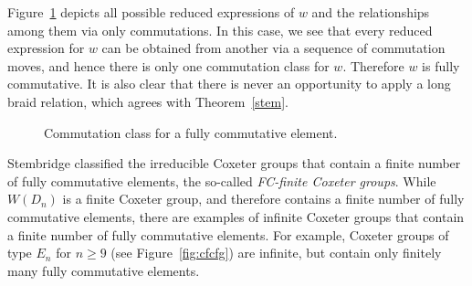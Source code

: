 \begin{example}
Figure~\ref{fig:commclass} depicts all possible reduced expressions of $w$ and the relationships among them via only commutations. In this case, we see that every reduced expression for $w$ can be obtained from another via a sequence of commutation moves, and hence there is only one commutation class for $w$. Therefore $w$ is fully commutative. It is also clear that there is never an opportunity to apply a long braid relation, which agrees with Theorem~\ref{stem}.

\begin{figure}[h]
\centering
{}
\caption{Commutation class for a fully commutative element.}
\label{fig:commclass}
\end{figure}
\end{example}

Stembridge classified the irreducible Coxeter groups that contain a finite number of fully commutative elements, the so-called \emph{FC-finite Coxeter groups}.  While $W(D_{n})$ is a finite Coxeter group, and therefore contains a finite number of fully commutative elements, there are examples of infinite Coxeter groups that contain a finite number of fully commutative elements.  For example, Coxeter groups of type $E_n$ for $n\geq 9$ (see Figure~\ref{fig:cfcfg}) are infinite, but contain only finitely many fully commutative elements.

